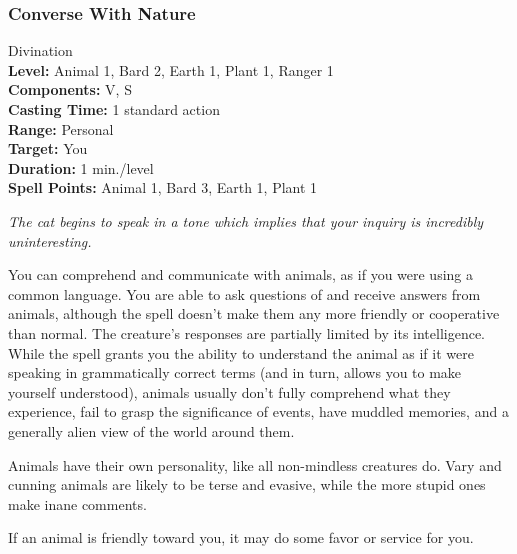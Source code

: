 \subsubsection{Converse With Nature}
\label{Spell:ConverseWithNature}
Divination
\\ \textbf{Level:} Animal 1, Bard 2, Earth 1, Plant 1, Ranger 1
\\ \textbf{Components:} V, S
\\ \textbf{Casting Time:} 1 standard action
\\ \textbf{Range:} Personal
\\ \textbf{Target:} You
\\ \textbf{Duration:} 1 min./level
\\ \textbf{Spell Points:} Animal 1, Bard 3, Earth 1, Plant 1

\emph{The cat begins to speak in a tone which implies that your inquiry is incredibly uninteresting.}

You can comprehend and communicate with animals, as if you were using a common language.
You are able to ask questions of and receive answers from animals, although the spell doesn't make them any more friendly or cooperative than normal.
The creature's responses are partially limited by its intelligence. While the spell grants you the ability to understand the animal as if it were speaking in grammatically correct terms (and in turn, allows you to make yourself understood), animals usually don't fully comprehend what they experience, fail to grasp the significance of events, have muddled memories, and a generally alien view of the world around them.

Animals have their own personality, like all non-mindless creatures do. Vary and cunning animals are likely to be terse and evasive, while the more stupid ones make inane comments.

If an animal is friendly toward you, it may do some favor or service for you.

